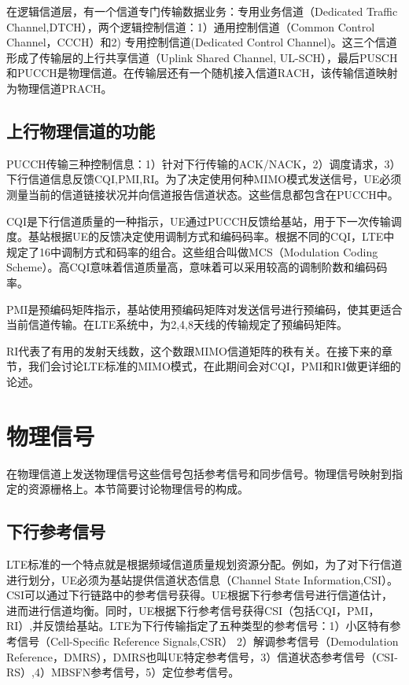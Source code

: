\documentclass[10pt,a4paper,UTF8]{article}
\begin{document}
在逻辑信道层，有一个信道专门传输数据业务：专用业务信道（Dedicated Traffic Channel,DTCH），两个逻辑控制信道：1）通用控制信道（Common Control Channel，CCCH）和2) 专用控制信道(Dedicated Control Channel)。这三个信道形成了传输层的上行共享信道（Uplink Shared Channel, UL-SCH），最后PUSCH和PUCCH是物理信道。在传输层还有一个随机接入信道RACH，该传输信道映射为物理信道PRACH。
\subsection{上行物理信道的功能}
\label{sec:orgheadline19}


PUCCH传输三种控制信息：1）针对下行传输的ACK/NACK，2）调度请求，3）下行信道信息反馈CQI,PMI,RI。为了决定使用何种MIMO模式发送信号，UE必须测量当前的信道链接状况并向信道报告信道状态。这些信息都包含在PUCCH中。

CQI是下行信道质量的一种指示，UE通过PUCCH反馈给基站，用于下一次传输调度。基站根据UE的反馈决定使用调制方式和编码码率。根据不同的CQI，LTE中规定了16中调制方式和码率的组合。这些组合叫做MCS（Modulation Coding Scheme）。高CQI意味着信道质量高，意味着可以采用较高的调制阶数和编码码率。

PMI是预编码矩阵指示，基站使用预编码矩阵对发送信号进行预编码，使其更适合当前信道传输。在LTE系统中，为2,4,8天线的传输规定了预编码矩阵。

RI代表了有用的发射天线数，这个数跟MIMO信道矩阵的秩有关。在接下来的章节，我们会讨论LTE标准的MIMO模式，在此期间会对CQI，PMI和RI做更详细的论述。
\section{物理信号}
\label{sec:orgheadline24}


在物理信道上发送物理信号这些信号包括参考信号和同步信号。物理信号映射到指定的资源栅格上。本节简要讨论物理信号的构成。
\subsection{下行参考信号}
\label{sec:orgheadline21}


LTE标准的一个特点就是根据频域信道质量规划资源分配。例如，为了对下行信道进行划分，UE必须为基站提供信道状态信息（Channel State Information,CSI）。CSI可以通过下行链路中的参考信号获得。UE根据下行参考信号进行信道估计，进而进行信道均衡。同时，UE根据下行参考信号获得CSI（包括CQI，PMI，RI）,并反馈给基站。LTE为下行传输指定了五种类型的参考信号：1）小区特有参考信号（Cell-Specific Reference Signals,CSR） 2）解调参考信号（Demodulation Reference，DMRS），DMRS也叫UE特定参考信号，3）信道状态参考信号（CSI-RS）,4）MBSFN参考信号，5）定位参考信号。
\end{document}
